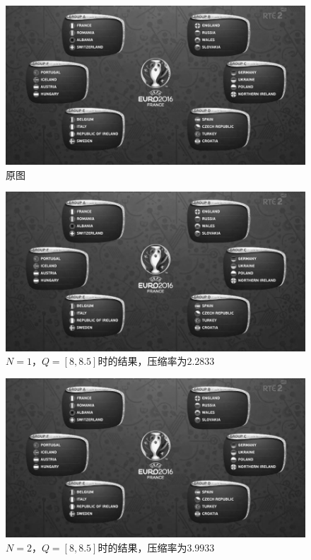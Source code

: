 \documentclass[UTF8]{ctexart}
\begin{document}
             			\begin{figure}[H]
             				\centering 
             				\includegraphics[scale=0.4]{orig.jpg} 
             				\caption{原图} 
             				\label{orig}
             			\end{figure}
                         
             			\begin{figure}[H]
             				\centering 
             				\includegraphics[scale=0.4]{n_1_q_8_8-5.jpg} 
             				\caption{$N = 1$，$Q = [8, 8.5]$时的结果，压缩率为$2.2833$} 
             				\label{n=1, Q=[8,8.5]}
             			\end{figure}                                          

             			\begin{figure}[H]
             				\centering 
             				\includegraphics[scale=0.4]{n_2_q_8_8-5.jpg} 
             				\caption{$N = 2$，$Q = [8, 8.5]$时的结果，压缩率为$3.9933$} 
             				\label{n=2, Q=[8,8.5]}
             			\end{figure}
                         
\end{document}
